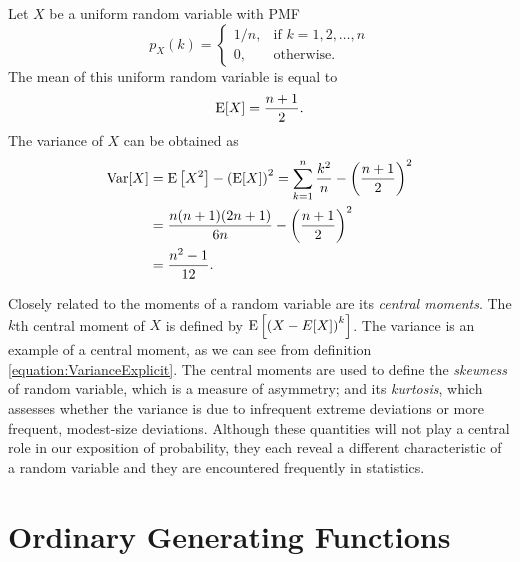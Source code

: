 \begin{example}
Let $X$ be a uniform random variable with PMF
\begin{equation*}
p_X (k) = \left\{ \begin{array}{ll}
1/n, & \text{if }k = 1, 2, \ldots, n \\
0, & \text{otherwise} .
\end{array} \right.
\end{equation*}
The mean of this uniform random variable is equal to
\begin{equation*}
\mathrm{E} [X] = \frac{n+1}{2} .
\end{equation*}
The variance of $X$ can be obtained as
\begin{equation*}
\begin{split}
\mathrm{Var} [X] &= \mathrm{E} \left[ X^2 \right] - \left( \mathrm{E} [X] \right)^2
= \sum_{k=1}^n \frac{k^2}{n} - \left( \frac{n+1}{2} \right)^2 \\
&= \frac{n(n+1)(2n+1)}{6n} - \left( \frac{n+1}{2} \right)^2 \\
&= \frac{n^2 - 1}{12} .
\end{split}
\end{equation*}
\end{example}

Closely related to the moments of a random variable are its \emph{central moments}. 
The $k$th central moment of $X$ is defined by $\mathrm{E} \left[ \left( X - E[X] \right)^k \right]$.
The variance is an example of a central moment, as we can see from definition \eqref{equation:VarianceExplicit}.
The central moments are used to define the \emph{skewness} of random variable, which is a measure of asymmetry; and its \emph{kurtosis}, which assesses whether the variance is due to infrequent extreme deviations or more frequent, modest-size deviations.
Although these quantities will not play a central role in our exposition of probability, they each reveal a different characteristic of a random variable and they are encountered frequently in statistics. 


\section{Ordinary Generating Functions}
\label{section:OrdinaryGeneratingFunctions}

